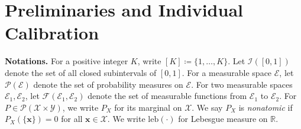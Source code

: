 \documentclass{article}
\theoremstyle{plain}
\theoremstyle{definition}
\theoremstyle{remark}
\begin{document}

 













\section{Preliminaries and Individual Calibration}
\label{sec:prel_indiv_calib}

\textbf{Notations.} For a positive integer $K$, write $[K]\coloneqq\{1,\dots,K\}$.
Let $\mathcal{I}([0,1])$ denote the set of all closed subintervals of $[0,1]$.
For a measurable space $\mathcal E$, let $\mathcal P(\mathcal E)$ denote the set of probability measures on $\mathcal E$.
For two measurable spaces $\mathcal E_1,\mathcal E_2$, let $\mathcal F(\mathcal E_1,\mathcal E_2)$ denote
the set of measurable functions from $\mathcal E_1$ to $\mathcal E_2$.
For $P\in\mathcal P(\mathcal X\times\mathcal Y)$, we write $P_X$ for its marginal on $\mathcal X$.
We say $P_X$ is \emph{nonatomic} if $P_X(\{\mathbf{x}\})=0$ for all $\mathbf{x}\in\mathcal X$.
We write $\mathrm{leb}(\cdot)$ for Lebesgue measure on $\mathbb R$.
\end{document}

